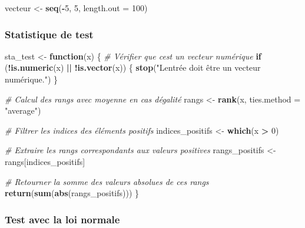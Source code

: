 \documentclass[
  12pt,
]{article}
\newenvironment{Shaded}{\begin{snugshade}}{\end{snugshade}}
\newcommand{\AttributeTok}[1]{\textcolor[rgb]{0.13,0.29,0.53}{#1}}
\newcommand{\CommentTok}[1]{\textcolor[rgb]{0.56,0.35,0.01}{\textit{#1}}}
\newcommand{\ControlFlowTok}[1]{\textcolor[rgb]{0.13,0.29,0.53}{\textbf{#1}}}
\newcommand{\DecValTok}[1]{\textcolor[rgb]{0.00,0.00,0.81}{#1}}
\newcommand{\FunctionTok}[1]{\textcolor[rgb]{0.13,0.29,0.53}{\textbf{#1}}}
\newcommand{\NormalTok}[1]{#1}
\newcommand{\OtherTok}[1]{\textcolor[rgb]{0.56,0.35,0.01}{#1}}
\newcommand{\SpecialCharTok}[1]{\textcolor[rgb]{0.81,0.36,0.00}{\textbf{#1}}}
\newcommand{\StringTok}[1]{\textcolor[rgb]{0.31,0.60,0.02}{#1}}
\begin{document}
\begin{Shaded}
\begin{Highlighting}[]
\NormalTok{vecteur }\OtherTok{\textless{}{-}} \FunctionTok{seq}\NormalTok{(}\SpecialCharTok{{-}}\DecValTok{5}\NormalTok{, }\DecValTok{5}\NormalTok{, }\AttributeTok{length.out =} \DecValTok{100}\NormalTok{)}
\end{Highlighting}
\end{Shaded}

\subsubsection{Statistique de test}\label{statistique-de-test}

\begin{Shaded}
\begin{Highlighting}[]
\NormalTok{sta\_test }\OtherTok{\textless{}{-}} \ControlFlowTok{function}\NormalTok{(x) \{}
  \CommentTok{\# Vérifier que c\textquotesingle{}est un vecteur numérique}
  \ControlFlowTok{if}\NormalTok{ (}\SpecialCharTok{!}\FunctionTok{is.numeric}\NormalTok{(x) }\SpecialCharTok{||} \SpecialCharTok{!}\FunctionTok{is.vector}\NormalTok{(x)) \{}
    \FunctionTok{stop}\NormalTok{(}\StringTok{"L\textquotesingle{}entrée doit être un vecteur numérique."}\NormalTok{)}
\NormalTok{  \}}
  
  \CommentTok{\# Calcul des rangs avec moyenne en cas d\textquotesingle{}égalité}
\NormalTok{  rangs }\OtherTok{\textless{}{-}} \FunctionTok{rank}\NormalTok{(x, }\AttributeTok{ties.method =} \StringTok{"average"}\NormalTok{)}
  
  \CommentTok{\# Filtrer les indices des éléments positifs}
\NormalTok{  indices\_positifs }\OtherTok{\textless{}{-}} \FunctionTok{which}\NormalTok{(x }\SpecialCharTok{\textgreater{}} \DecValTok{0}\NormalTok{)}
  
  \CommentTok{\# Extraire les rangs correspondants aux valeurs positives}
\NormalTok{  rangs\_positifs }\OtherTok{\textless{}{-}}\NormalTok{ rangs[indices\_positifs]}
  
  \CommentTok{\# Retourner la somme des valeurs absolues de ces rangs}
  \FunctionTok{return}\NormalTok{(}\FunctionTok{sum}\NormalTok{(}\FunctionTok{abs}\NormalTok{(rangs\_positifs)))}
\NormalTok{\}}
\end{Highlighting}
\end{Shaded}

\subsubsection{Test avec la loi normale}\label{test-avec-la-loi-normale}
\end{document}
